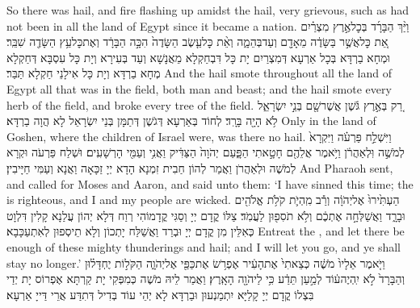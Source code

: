 {So there was hail, and fire flashing up amidst the hail, very grievous, such as had not been in all the land of Egypt since it became a nation.}{}
{וַיַּ֨ךְ הַבָּרָ֜ד בְּכׇל\maqqaf אֶ֣רֶץ מִצְרַ֗יִם אֵ֚ת כׇּל\maqqaf אֲשֶׁ֣ר בַּשָּׂדֶ֔ה מֵאָדָ֖ם וְעַד\maqqaf בְּהֵמָ֑ה וְאֵ֨ת כׇּל\maqqaf עֵ֤שֶׂב הַשָּׂדֶה֙ הִכָּ֣ה הַבָּרָ֔ד וְאֶת\maqqaf כׇּל\maqqaf עֵ֥ץ הַשָּׂדֶ֖ה שִׁבֵּֽר׃}
{וּמְחָא בַרְדָּא בְּכָל אַרְעָא דְּמִצְרַיִם יָת כָּל דִּבְחַקְלָא מֵאֲנָשָׁא וְעַד בְּעִירָא וְיָת כָּל עִסְבָּא דְּחַקְלָא מְחָא בַרְדָּא וְיָת כָּל אִילָנֵי חַקְלָא תַּבַּר׃}
{And the hail smote throughout all the land of Egypt all that was in the field, both man and beast; and the hail smote every herb of the field, and broke every tree of the field.}{}
{רַ֚ק בְּאֶ֣רֶץ גֹּ֔שֶׁן אֲשֶׁר\maqqaf שָׁ֖ם בְּנֵ֣י יִשְׂרָאֵ֑ל לֹ֥א הָיָ֖ה בָּרָֽד׃}
{לְחוֹד בְּאַרְעָא דְּגֹשֶׁן דְּתַמָּן בְּנֵי יִשְׂרָאֵל לָא הֲוָה בַרְדָּא׃}
{Only in the land of Goshen, where the children of Israel were, was there no hail.}{}
{וַיִּשְׁלַ֣ח פַּרְעֹ֗ה וַיִּקְרָא֙ לְמֹשֶׁ֣ה וּֽלְאַהֲרֹ֔ן וַיֹּ֥אמֶר אֲלֵהֶ֖ם חָטָ֣אתִי הַפָּ֑עַם יְהֹוָה֙ הַצַּדִּ֔יק וַאֲנִ֥י וְעַמִּ֖י הָרְשָׁעִֽים׃}
{וּשְׁלַח פַּרְעֹה וּקְרָא לְמֹשֶׁה וּלְאַהֲרֹן וַאֲמַר לְהוֹן חַבִית זִמְנָא הָדָא יְיָ זַכָּאָה וַאֲנָא וְעַמִּי חַיָּיבִין׃}
{And Pharaoh sent, and called for Moses and Aaron, and said unto them: ‘I have sinned this time; the \lord\space is righteous, and I and my people are wicked.}{}
{הַעְתִּ֙ירוּ֙ אֶל\maqqaf יְהֹוָ֔ה וְרַ֕ב מִֽהְיֹ֛ת קֹלֹ֥ת אֱלֹהִ֖ים וּבָרָ֑ד וַאֲשַׁלְּחָ֣ה אֶתְכֶ֔ם וְלֹ֥א תֹסִפ֖וּן לַעֲמֹֽד׃}
{צַלּוֹ קֳדָם יְיָ וְסַגִּי קֳדָמוֹהִי רְוַח דְּלָא יְהוֹן עֲלַנָא קָלִין דִּלְוָט כְּאִלֵּין מִן קֳדָם יְיָ וּבְרַד וַאֲשַׁלַּח יָתְכוֹן וְלָא תֵיסְפוּן לְאִתְעַכָּבָא׃}
{Entreat the \lord, and let there be enough of these mighty thunderings and hail; and I will let you go, and ye shall stay no longer.’}{}
{וַיֹּ֤אמֶר אֵלָיו֙ מֹשֶׁ֔ה כְּצֵאתִי֙ אֶת\maqqaf הָעִ֔יר אֶפְרֹ֥שׂ אֶת\maqqaf כַּפַּ֖י אֶל\maqqaf יְהֹוָ֑ה הַקֹּל֣וֹת יֶחְדָּל֗וּן וְהַבָּרָד֙ לֹ֣א יִֽהְיֶה\maqqaf ע֔וֹד לְמַ֣עַן תֵּדַ֔ע כִּ֥י לַיהֹוָ֖ה הָאָֽרֶץ׃}
{וַאֲמַר לֵיהּ מֹשֶׁה כְּמִפְּקִי יָת קַרְתָּא אֶפְרוֹס יָת יְדַי בִּצְלוֹ קֳדָם יְיָ קָלַיָּא יִתְמַנְעוּן וּבַרְדָּא לָא יְהֵי עוֹד בְּדִיל דְּתִדַּע אֲרֵי דַּייָ אַרְעָא׃}

